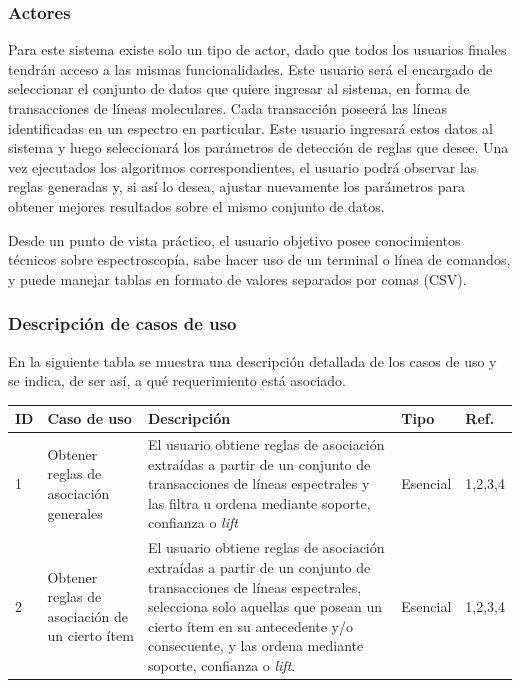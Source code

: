 \subsubsection{Actores}

Para este sistema existe solo un tipo de actor, dado que todos los usuarios finales tendrán acceso a las mismas funcionalidades. Este usuario será el encargado de seleccionar el conjunto de datos que quiere ingresar al sistema, en forma de transacciones de líneas moleculares. Cada transacción poseerá las líneas identificadas en un espectro en particular. Este usuario ingresará estos datos al sistema y luego seleccionará los parámetros de detección de reglas que desee. Una vez ejecutados los algoritmos correspondientes, el usuario podrá observar las reglas generadas y, si así lo desea, ajustar nuevamente los parámetros para obtener mejores resultados sobre el mismo conjunto de datos.

Desde un punto de vista práctico, el usuario objetivo posee conocimientos técnicos sobre espectroscopía, sabe hacer uso de un terminal o línea de comandos, y puede manejar tablas en formato de valores separados por comas (CSV).


\subsubsection{Descripción de casos de uso}

En la siguiente tabla se muestra una descripción detallada de los casos de uso y se indica, de ser así, a qué requerimiento está asociado.

\begin{tabular}{|l|p{4cm}|p{7cm}|l|l|}
	\hline
	ID & Caso de uso & Descripción & Tipo & Ref. \\ \hline
	1 & Obtener reglas de asociación generales & El usuario obtiene reglas de asociación extraídas a partir de un conjunto de transacciones de líneas espectrales y las filtra u ordena mediante soporte, confianza o \textit{lift} & Esencial & 1,2,3,4 \\ \hline
	2 & Obtener reglas de asociación de un cierto ítem & El usuario obtiene reglas de asociación extraídas a partir de un conjunto de transacciones de líneas espectrales, selecciona solo aquellas que posean un cierto ítem en su antecedente y/o consecuente, y las ordena mediante soporte, confianza o \textit{lift}. & Esencial & 1,2,3,4 \\ \hline
\end{tabular}
